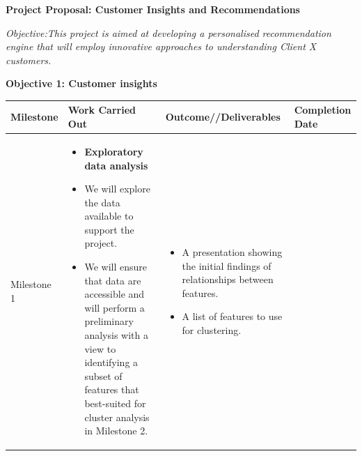 \documentclass[
]{book}
\providecommand{\tightlist}{%
  \setlength{\itemsep}{0pt}\setlength{\parskip}{0pt}}
\begin{document}
\textbf{Project Proposal: Customer Insights and Recommendations}

\emph{Objective:This project is aimed at developing a personalised
recommendation engine that will employ innovative approaches to
understanding Client X customers.}

\textbf{Objective 1: Customer insights}

\begin{longtable}[]{@{}llll@{}}
\toprule
\begin{minipage}[b]{0.14\columnwidth}\raggedright
Milestone\strut
\end{minipage} & \begin{minipage}[b]{0.30\columnwidth}\raggedright
Work Carried Out\strut
\end{minipage} & \begin{minipage}[b]{0.30\columnwidth}\raggedright
Outcome//Deliverables\strut
\end{minipage} & \begin{minipage}[b]{0.15\columnwidth}\raggedright
Completion Date\strut
\end{minipage}\tabularnewline
\midrule
\endhead
\begin{minipage}[t]{0.14\columnwidth}\raggedright
Milestone 1\strut
\end{minipage} & \begin{minipage}[t]{0.30\columnwidth}\raggedright
\begin{itemize}
\tightlist
\item
  \textbf{Exploratory data analysis}
\item
  We will explore the data available to support the project.
\item
  We will ensure that data are accessible and will perform a preliminary
  analysis with a view to identifying a subset of features that
  best-suited for cluster analysis in Milestone 2.
\end{itemize}\strut
\end{minipage} & \begin{minipage}[t]{0.30\columnwidth}\raggedright
\begin{itemize}
\tightlist
\item
  A presentation showing the initial findings of relationships between
  features.
\item
  A list of features to use for clustering.
\end{itemize}\strut
\end{minipage} & \begin{minipage}[t]{0.15\columnwidth}\raggedright

\end{minipage}
\end{longtable}
\end{document}
